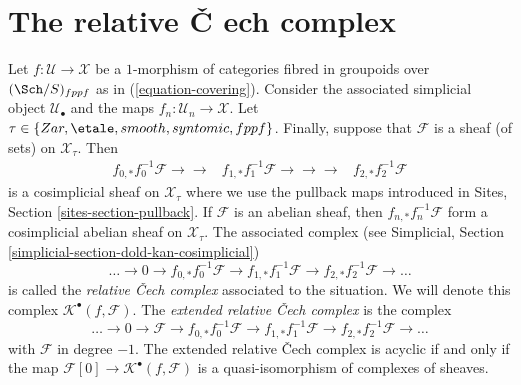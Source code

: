 \section{The relative {\v C}
ech complex}
\label{stacks-sheaves-section-sheaf-cech-complex}

Let $f : \mathcal{U} \to \mathcal{X}$ be a $1$-morphism of categories
fibred in groupoids over $(\Sch/S)_{fppf}$ as in
(\ref{equation-covering}). Consider the associated simplicial
object $\mathcal{U}_\bullet$ and the maps
$f_n : \mathcal{U}_n \to \mathcal{X}$. Let
$\tau \in \{Zar, \etale, smooth, syntomic, fppf\}$.
Finally, suppose that $\mathcal{F}$ is a sheaf (of sets)
on $\mathcal{X}_\tau$. Then
$$
\begin{array}{ccc}f_{0, *}f_0^{-1}\mathcal{F}
\longrightarrow\longrightarrow & f_{1, *}f_1^{-1}\mathcal{F}
\longrightarrow\longrightarrow\longrightarrow & f_{2, *}f_2^{-1}\mathcal{F}\end{array}
$$
is a cosimplicial sheaf on $\mathcal{X}_\tau$ where we use the pullback maps
introduced in
Sites, Section \ref{sites-section-pullback}.
If $\mathcal{F}$ is an abelian sheaf, then $f_{n, *}f_n^{-1}\mathcal{F}$
form a cosimplicial abelian sheaf on $\mathcal{X}_\tau$.
The associated complex (see
Simplicial, Section \ref{simplicial-section-dold-kan-cosimplicial})
$$
\ldots \to 0 \to
f_{0, *}f_0^{-1}\mathcal{F} \to
f_{1, *}f_1^{-1}\mathcal{F} \to
f_{2, *}f_2^{-1}\mathcal{F} \to \ldots
$$
is called the {\it relative {\v C}ech complex} associated to the situation.
We will denote this complex $\mathcal{K}^\bullet(f, \mathcal{F})$.
The {\it extended relative {\v C}ech complex} is the complex
$$
\ldots \to 0 \to
\mathcal{F} \to
f_{0, *}f_0^{-1}\mathcal{F} \to
f_{1, *}f_1^{-1}\mathcal{F} \to
f_{2, *}f_2^{-1}\mathcal{F} \to \ldots
$$
with $\mathcal{F}$ in degree $-1$. The extended relative {\v C}ech complex
is acyclic if and only if the map
$\mathcal{F}[0] \to \mathcal{K}^\bullet(f, \mathcal{F})$
is a quasi-isomorphism of complexes of sheaves.

